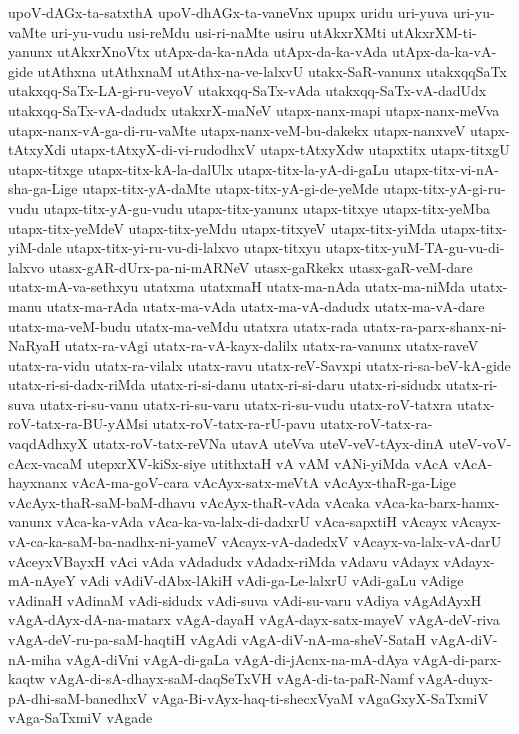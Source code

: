 {upoV-dAGx-ta-satxthA
upoV-dhAGx-ta-vaneVnx
upupx
uridu
uri-yuva
uri-yu-vaMte
uri-yu-vudu
usi-reMdu
usi-ri-naMte
usiru
utAkxrXMti
utAkxrXM-ti-yanunx
utAkxrXnoVtx
utApx-da-ka-nAda
utApx-da-ka-vAda
utApx-da-ka-vA-gide
utAthxna
utAthxnaM
utAthx-na-ve-lalxvU
utakx-SaR-vanunx
utakxqqSaTx
utakxqq-SaTx-LA-gi-ru-veyoV
utakxqq-SaTx-vAda
utakxqq-SaTx-vA-dadUdx
utakxqq-SaTx-vA-dadudx
utakxrX-maNeV
utapx-nanx-mapi
utapx-nanx-meVva
utapx-nanx-vA-ga-di-ru-vaMte
utapx-nanx-veM-bu-dakekx
utapx-nanxveV
utapx-tAtxyXdi
utapx-tAtxyX-di-vi-rudodhxV
utapx-tAtxyXdw
utapxtitx
utapx-titxgU
utapx-titxge
utapx-titx-kA-la-dalUlx
utapx-titx-la-yA-di-gaLu
utapx-titx-vi-nA-sha-ga-Lige
utapx-titx-yA-daMte
utapx-titx-yA-gi-de-yeMde
utapx-titx-yA-gi-ru-vudu
utapx-titx-yA-gu-vudu
utapx-titx-yanunx
utapx-titxye
utapx-titx-yeMba
utapx-titx-yeMdeV
utapx-titx-yeMdu
utapx-titxyeV
utapx-titx-yiMda
utapx-titx-yiM-dale
utapx-titx-yi-ru-vu-di-lalxvo
utapx-titxyu
utapx-titx-yuM-TA-gu-vu-di-lalxvo
utasx-gAR-dUrx-pa-ni-mARNeV
utasx-gaRkekx
utasx-gaR-veM-dare
utatx-mA-va-sethxyu
utatxma
utatxmaH
utatx-ma-nAda
utatx-ma-niMda
utatx-manu
utatx-ma-rAda
utatx-ma-vAda
utatx-ma-vA-dadudx
utatx-ma-vA-dare
utatx-ma-veM-budu
utatx-ma-veMdu
utatxra
utatx-rada
utatx-ra-parx-shanx-ni-NaRyaH
utatx-ra-vAgi
utatx-ra-vA-kayx-dalilx
utatx-ra-vanunx
utatx-raveV
utatx-ra-vidu
utatx-ra-vilalx
utatx-ravu
utatx-reV-Savxpi
utatx-ri-sa-beV-kA-gide
utatx-ri-si-dadx-riMda
utatx-ri-si-danu
utatx-ri-si-daru
utatx-ri-sidudx
utatx-ri-suva
utatx-ri-su-vanu
utatx-ri-su-varu
utatx-ri-su-vudu
utatx-roV-tatxra
utatx-roV-tatx-ra-BU-yAMsi
utatx-roV-tatx-ra-rU-pavu
utatx-roV-tatx-ra-vaqdAdhxyX
utatx-roV-tatx-reVNa
utavA
uteVva
uteV-veV-tAyx-dinA
uteV-voV-cAcx-vacaM
utepxrXV-kiSx-siye
utithxtaH
vA
vAM
vANi-yiMda
vAcA
vAcA-hayxnanx
vAcA-ma-goV-cara
vAcAyx-satx-meVtA
vAcAyx-thaR-ga-Lige
vAcAyx-thaR-saM-baM-dhavu
vAcAyx-thaR-vAda
vAcaka
vAca-ka-barx-hamx-vanunx
vAca-ka-vAda
vAca-ka-va-lalx-di-dadxrU
vAca-sapxtiH
vAcayx
vAcayx-vA-ca-ka-saM-ba-nadhx-ni-yameV
vAcayx-vA-dadedxV
vAcayx-va-lalx-vA-darU
vAceyxVBayxH
vAci
vAda
vAdadudx
vAdadx-riMda
vAdavu
vAdayx
vAdayx-mA-nAyeY
vAdi
vAdiV-dAbx-lAkiH
vAdi-ga-Le-lalxrU
vAdi-gaLu
vAdige
vAdinaH
vAdinaM
vAdi-sidudx
vAdi-suva
vAdi-su-varu
vAdiya
vAgAdAyxH
vAgA-dAyx-dA-na-matarx
vAgA-dayaH
vAgA-dayx-satx-mayeV
vAgA-deV-riva
vAgA-deV-ru-pa-saM-haqtiH
vAgAdi
vAgA-diV-nA-ma-sheV-SataH
vAgA-diV-nA-miha
vAgA-diVni
vAgA-di-gaLa
vAgA-di-jAcnx-na-mA-dAya
vAgA-di-parx-kaqtw
vAgA-di-sA-dhayx-saM-daqSeTxVH
vAgA-di-ta-paR-Namf
vAgA-duyx-pA-dhi-saM-banedhxV
vAga-Bi-vAyx-haq-ti-shecxVyaM
vAgaGxyX-SaTxmiV
vAga-SaTxmiV
vAgade
}
